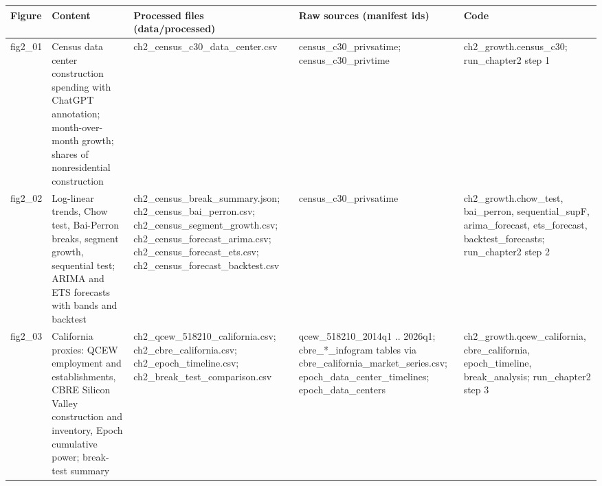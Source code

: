 \begin{tabular}{lp{4.6cm}p{5.2cm}p{4.6cm}p{4.8cm}}
\toprule
Figure & Content & Processed files (data/processed) & Raw sources (manifest ids) & Code \\
\midrule
fig2\_\allowbreak{}01 & Census data center construction spending with ChatGPT annotation; month-over-month growth; shares of nonresidential construction & ch2\_\allowbreak{}census\_\allowbreak{}c30\_\allowbreak{}data\_\allowbreak{}center.csv & census\_\allowbreak{}c30\_\allowbreak{}privsatime; census\_\allowbreak{}c30\_\allowbreak{}privtime & ch2\_\allowbreak{}growth.census\_\allowbreak{}c30; run\_\allowbreak{}chapter2 step 1 \\
fig2\_\allowbreak{}02 & Log-linear trends, Chow test, Bai-Perron breaks, segment growth, sequential test; ARIMA and ETS forecasts with bands and backtest & ch2\_\allowbreak{}census\_\allowbreak{}break\_\allowbreak{}summary.json; ch2\_\allowbreak{}census\_\allowbreak{}bai\_\allowbreak{}perron.csv; ch2\_\allowbreak{}census\_\allowbreak{}segment\_\allowbreak{}growth.csv; ch2\_\allowbreak{}census\_\allowbreak{}forecast\_\allowbreak{}arima.csv; ch2\_\allowbreak{}census\_\allowbreak{}forecast\_\allowbreak{}ets.csv; ch2\_\allowbreak{}census\_\allowbreak{}forecast\_\allowbreak{}backtest.csv & census\_\allowbreak{}c30\_\allowbreak{}privsatime & ch2\_\allowbreak{}growth.chow\_\allowbreak{}test, bai\_\allowbreak{}perron, sequential\_\allowbreak{}supF, arima\_\allowbreak{}forecast, ets\_\allowbreak{}forecast, backtest\_\allowbreak{}forecasts; run\_\allowbreak{}chapter2 step 2 \\
fig2\_\allowbreak{}03 & California proxies: QCEW employment and establishments, CBRE Silicon Valley construction and inventory, Epoch cumulative power; break-test summary & ch2\_\allowbreak{}qcew\_\allowbreak{}518210\_\allowbreak{}california.csv; ch2\_\allowbreak{}cbre\_\allowbreak{}california.csv; ch2\_\allowbreak{}epoch\_\allowbreak{}timeline.csv; ch2\_\allowbreak{}break\_\allowbreak{}test\_\allowbreak{}comparison.csv & qcew\_\allowbreak{}518210\_\allowbreak{}2014q1 .. 2026q1; cbre\_\allowbreak{}*\_\allowbreak{}infogram tables via cbre\_\allowbreak{}california\_\allowbreak{}market\_\allowbreak{}series.csv; epoch\_\allowbreak{}data\_\allowbreak{}center\_\allowbreak{}timelines; epoch\_\allowbreak{}data\_\allowbreak{}centers & ch2\_\allowbreak{}growth.qcew\_\allowbreak{}california, cbre\_\allowbreak{}california, epoch\_\allowbreak{}timeline, break\_\allowbreak{}analysis; run\_\allowbreak{}chapter2 step 3 \\

\end{tabular}
